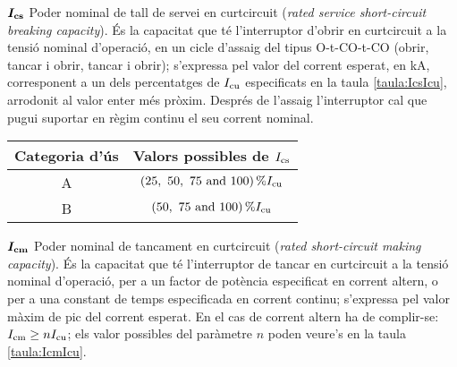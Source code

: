\begin{list}{}
    \item[$\boldsymbol{I_\mathrm{cs}}$] Poder nominal de tall de servei en curtcircuit (\textit{rated service  short-circuit breaking capacity}). És la capacitat que té l'interruptor d'obrir en curtcircuit a la tensió nominal d'operació, en un cicle d'assaig del tipus O-t-CO-t-CO (obrir, tancar i obrir, tancar i obrir); s'expressa pel valor  del corrent esperat, en kA, corresponent a un dels percentatges de $I_\mathrm{cu}$ especificats en la taula \vref{taula:IcsIcu}, arrodonit al valor enter més pròxim. Després de l'assaig l'interruptor cal que pugui suportar en règim continu  el seu corrent nominal.

        \begin{center}
            \label{taula:IcsIcu}
           \begin{tabular}{cc}
           \toprule[1pt]
           Categoria d'ús &  Valors possibles de $I_\mathrm{cs}$ \\
           \midrule
           A & $\qtylist[list-units = brackets]{25;50;75;100}{\percent} I\ped{cu}$ \\
           B & $\qtylist[list-units = brackets]{50;75;100}{\percent} I\ped{cu}$  \\
           \bottomrule[1pt]
           \end{tabular}
         \end{center}
    \item[$\boldsymbol{I_\mathrm{cm}}$] Poder nominal de tancament en curtcircuit (\textit{rated short-circuit making capacity}). És la capacitat que té l'interruptor de tancar en curtcircuit a la tensió nominal d'operació, per a un factor de potència especificat en corrent altern, o per a una constant de temps especificada en corrent continu; s'expressa pel valor màxim de pic del corrent esperat. En el cas de corrent altern ha de complir-se: $I_\mathrm{cm} \geq n I_\mathrm{cu}$; els valor possibles del paràmetre $n$ poden veure's en la taula \vref{taula:IcmIcu}.


\end{list}
